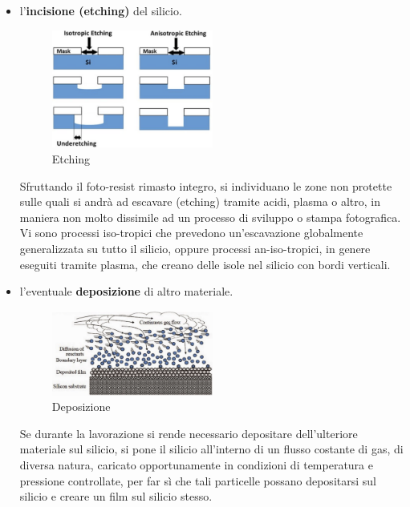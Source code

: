 \documentclass[a4paper]{extarticle}
\begin{document}
\begin{itemize}
    \item l'\textbf{incisione (etching)} del silicio.
    
    \begin{figure}[H]
        \centering
        \includegraphics[width=0.5\textwidth]{etching.png}
        \caption{Etching}
        \label{fig:etching}
    \end{figure}

    \noindent
    Sfruttando il foto-resist rimasto integro, si individuano le zone non protette sulle quali si andrà ad escavare (etching) tramite acidi, plasma o altro, in maniera non molto dissimile ad un processo di sviluppo o stampa fotografica.\\
    Vi sono processi iso-tropici che prevedono un'escavazione globalmente generalizzata su tutto il silicio, oppure processi an-iso-tropici, in genere eseguiti tramite plasma, che creano delle isole nel silicio con bordi verticali.

    \item l'eventuale \textbf{deposizione} di altro materiale.
    
    \begin{figure}[H]
        \centering
        \includegraphics[width=0.5\textwidth]{deposizione.png}
        \caption{Deposizione}
        \label{fig:deposizione}
    \end{figure}

    \noindent
    Se durante la lavorazione si rende necessario depositare dell'ulteriore materiale sul silicio, si pone il silicio all'interno di un flusso costante di gas, di diversa natura, caricato opportunamente in condizioni di temperatura e pressione controllate, per far sì che tali particelle possano depositarsi sul silicio e creare un film sul silicio stesso.


\end{itemize}
\end{document}
